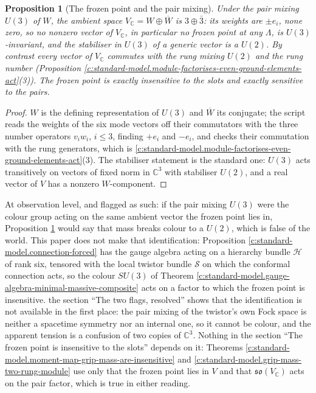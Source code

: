 \documentclass[11pt]{article}
\newtheorem{proposition}[theorem]{Proposition}
\theoremstyle{definition}
\theoremstyle{plain}
\newcommand{\changedmark}[2]{\marginpar{\raggedright\scriptsize\color{#1}#2}}
\providecommand{\C}{}\renewcommand{\C}{\mathbb{C}}
\providecommand{\so}{}\renewcommand{\so}{\mathfrak{so}}
\begin{document}
\begin{proposition}[The frozen point and the pair mixing]\label{c:standard-model.frozen-point-pair-mixing}
\changedmark{gray}{reworded}
Under the pair mixing $U(3)$ of $W$, the ambient space $V_{\C} = W \oplus \overline{W}$ is $3 \oplus \bar{3}$: its weights are $\pm e_{i}$, none zero, so no nonzero vector of $V_{\C}$, in particular no frozen point at any $\Lambda$, is $U(3)$-invariant, and the stabiliser in $U(3)$ of a generic vector is a $U(2)$. By contrast every vector of $V_{\C}$ commutes with the rung mixing $U(2)$ and the rung number (Proposition \ref{c:standard-model.module-factorises-even-ground-elements-act}(3)). The frozen point is exactly insensitive to the slots and exactly sensitive to the pairs.
\end{proposition}
\begin{proof}
$W$ is the defining representation of $U(3)$ and $\overline{W}$ its conjugate; the script reads the weights of the six mode vectors off their commutators with the three number operators $v_{i}w_{i}$, $i \le 3$, finding $+e_{i}$ and $-e_{i}$, and checks their commutation with the rung generators, which is \ref{c:standard-model.module-factorises-even-ground-elements-act}(3). The stabiliser statement is the standard one: $U(3)$ acts transitively on vectors of fixed norm in $\C^{3}$ with stabiliser $U(2)$, and a real vector of $V$ has a nonzero $W$-component.

\end{proof}

\label{c:note.standard-model.setting-what-not-derived-series-2}
At observation level, and flagged as such: if the pair mixing $U(3)$ were the colour group acting on the same ambient vector the frozen point lies in, Proposition \ref{c:standard-model.frozen-point-pair-mixing} would say that mass breaks colour to a $U(2)$, which is false of the world. This paper does not make that identification: Proposition \ref{c:standard-model.connection-forced} has the gauge algebra acting on a hierarchy bundle $\mathcal{H}$ of rank six, tensored with the local twistor bundle $\mathcal{S}$ on which the conformal connection acts, so the colour $SU(3)$ of Theorem \ref{c:standard-model.gauge-algebra-minimal-massive-composite} acts on a factor to which the frozen point is insensitive. the section ``The two flags, resolved'' shows that the identification is not available in the first place: the pair mixing of the twistor's own Fock space is neither a spacetime symmetry nor an internal one, so it cannot be colour, and the apparent tension is a confusion of two copies of $\C^{3}$. Nothing in the section ``The frozen point is insensitive to the slots'' depends on it: Theorems \ref{c:standard-model.moment-map-grip-mass-are-insensitive} and \ref{c:standard-model.grip-mass-two-rung-module} use only that the frozen point lies in $V$ and that $\so(V_{\C})$ acts on the pair factor, which is true in either reading.
\end{document}
